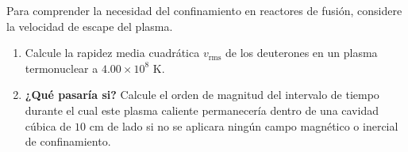 \item Para comprender la necesidad del confinamiento en reactores de fusión, considere la velocidad de escape del plasma.
\begin{enumerate}
    \item Calcule la rapidez media cuadrática $v_{\text{rms}}$ de los deuterones en un plasma termonuclear a $4.00 \times 10^8\text{ K}$.
    \item \textbf{¿Qué pasaría si?} Calcule el orden de magnitud del intervalo de tiempo durante el cual este plasma caliente permanecería dentro de una cavidad cúbica de $10\text{ cm}$ de lado si no se aplicara ningún campo magnético o inercial de confinamiento.
\end{enumerate}